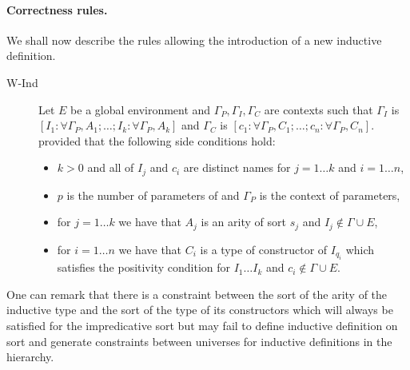 \paragraph{Correctness rules.}
We shall now describe the rules allowing the introduction of a new
inductive definition.

\begin{description}
\item[W-Ind] Let $E$ be a global environment and
  $\Gamma_P,\Gamma_I,\Gamma_C$ are contexts such that
  $\Gamma_I$ is $[I_1:\forall \Gamma_P,A_1;\ldots;I_k:\forall
  \Gamma_P,A_k]$ and $\Gamma_C$ is 
  $[c_1:\forall \Gamma_P,C_1;\ldots;c_n:\forall \Gamma_P,C_n]$. 
provided that the following side conditions hold:
\begin{itemize}
\item $k>0$ and all of $I_j$ and $c_i$ are distinct names for $j=1\ldots  k$ and $i=1\ldots  n$,
\item $p$ is the number of parameters of 
  and $\Gamma_P$ is the context of parameters, 
\item for $j=1\ldots  k$ we have that $A_j$ is an arity of sort $s_j$ and $I_j
  \notin \Gamma \cup E$,
\item for $i=1\ldots  n$ we have that $C_i$ is a type of constructor of
  $I_{q_i}$ which satisfies the positivity condition for $I_1 \ldots  I_k$
  and $c_i \notin \Gamma \cup E$.
\end{itemize}
\end{description}
One can remark that there is a constraint between the sort of the
arity of the inductive type and the sort of the type of its
constructors which will always be satisfied for the impredicative sort
{\Prop} but may fail to define inductive definition 
on sort \Set{} and generate constraints between universes for
inductive definitions in the {\Type} hierarchy.

